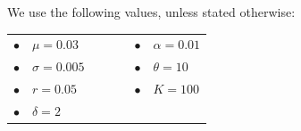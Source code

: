 We use the following values, unless stated otherwise:

\begin{table}[!htb]
	\centering
	\begin{tabular}{lllllll}
		 $\bullet$ & $\mu=0.03$     &  & \hspace{7cm} &  &  $\bullet$ & $\alpha=0.01$ \\
		 $\bullet$ & $\sigma=0.005$ &  & \hspace{7cm} &  &  $\bullet$ & $\theta=10$   \\
		 $\bullet$ & $r=0.05$       &  & \hspace{7cm} &  &  $\bullet$ & $K=100$       \\
		 $\bullet$ & $\delta=2$                                
	\end{tabular}
\end{table}	

